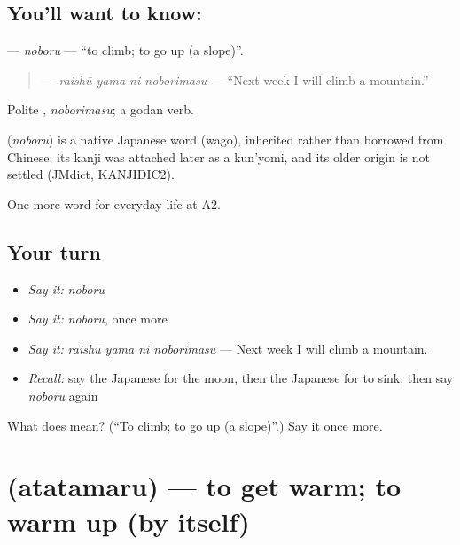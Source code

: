 \subsection*{You'll want to know: }
\textbf{} — \emph{noboru} — \textquotedblleft{}to climb; to go up (a slope)\textquotedblright{}.

\begin{quote}
\textbf{  } — \emph{raishū yama ni noborimasu} — \textquotedblleft{}Next week I will climb a mountain.\textquotedblright{}
\end{quote}

Polite \textbf{}, \emph{noborimasu}; a godan verb.

\begin{cousinweb}
\textbf{} (\emph{noboru}) is a native Japanese word (wago), inherited rather than borrowed from Chinese; its kanji was attached later as a kun'yomi, and its older origin is not settled (JMdict, KANJIDIC2).
\end{cousinweb}

\begin{grammarlens}[title={What you've built}]
One more word for everyday life at A2.
\end{grammarlens}

\subsection*{Your turn}
\begin{itemize}
\raggedright
  \item \emph{Say it:} \emph{noboru}
  \item \emph{Say it:} \emph{noboru}, once more
  \item \emph{Say it:} \emph{raishū yama ni noborimasu} — Next week I will climb a mountain.
  \item \emph{Recall:} say the Japanese for the moon, then the Japanese for to sink, then say \emph{noboru} again
\end{itemize}

\begin{tcolorbox}[breakable,colback=teal!4,colframe=teal!35!black,title={Before you move on}]
What does  mean? (\textquotedblleft{}To climb; to go up (a slope)\textquotedblright{}.) Say it once more.
\end{tcolorbox}
\section[\texorpdfstring{\ja{あたたまる} (atatamaru)}{あたたまる (atatamaru)}]{ (atatamaru) — to get warm; to warm up (by itself)}

